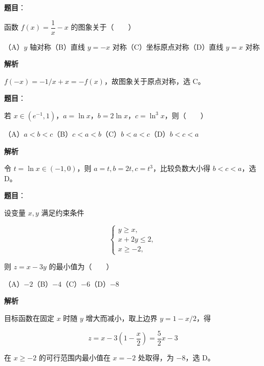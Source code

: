 \begin{answer}

\textbf{题目}：

函数 $f(x)=\dfrac1x-x$ 的图象关于\mbox{（　　）}

（A）$y$ 轴对称\quad（B）直线 $y=-x$ 对称\quad（C）坐标原点对称\quad（D）直线 $y=x$ 对称

\textbf{解析}

$f(-x)=-1/x+x=-f(x)$，故图象关于原点对称，选 C。


\end{answer}
\begin{answer}

\textbf{题目}：

若 $x\in(e^{-1},1)$，$a=\ln x$，$b=2\ln x$，$c=\ln^3x$，则\mbox{（　　）}

（A）$a<b<c$\quad（B）$c<a<b$\quad（C）$b<a<c$\quad（D）$b<c<a$

\textbf{解析}

令 $t=\ln x\in(-1,0)$，则 $a=t,b=2t,c=t^3$，比较负数大小得 $b<c<a$，选 D。


\end{answer}
\begin{answer}

\textbf{题目}：

设变量 $x,y$ 满足约束条件

\nopagebreak[4]
\[
\begin{cases}
y\geqslant x,\\
x+2y\leqslant2,\\
x\geqslant-2,
\end{cases}
\]

则 $z=x-3y$ 的最小值为\mbox{（　　）}

（A）$-2$\quad（B）$-4$\quad（C）$-6$\quad（D）$-8$

\textbf{解析}

目标函数在固定 $x$ 时随 $y$ 增大而减小，取上边界 $y=1-x/2$，得

\nopagebreak[4]
\[
z=x-3\left(1-\frac x2\right)=\frac52x-3
\]

在 $x\geqslant-2$ 的可行范围内最小值在 $x=-2$ 处取得，为 $-8$，选 D。


\end{answer}
